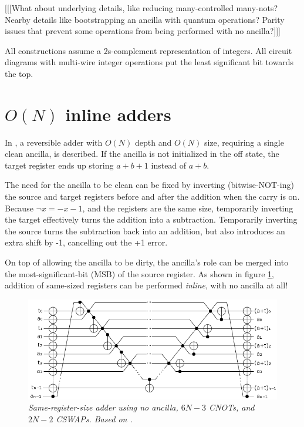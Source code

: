 \documentclass[twocolumn]{article}
\begin{document}
[[[What about underlying details, like reducing many-controlled many-nots? Nearby details like bootstrapping an ancilla with quantum operations? Parity issues that prevent some operations from being performed with no ancilla?]]]

All constructions assume a 2s-complement representation of integers.
All circuit diagrams with multi-wire integer operations put the least significant bit towards the top.

\section{$O(N)$ inline adders}

In \cite{van2004}, a reversible adder with $O(N)$ depth and $O(N)$ size, requiring a single clean ancilla, is described.
If the ancilla is not initialized in the off state, the target register ends up storing $a+b+1$ instead of $a+b$.

The need for the ancilla to be clean can be fixed by inverting (bitwise-NOT-ing) the source and target registers before and after the addition when the carry is on.
Because $\lnot x = -x-1$, and the registers are the same size, temporarily inverting the target effectively turns the addition into a subtraction.
Temporarily inverting the source turns the subtraction back into an addition, but also introduces an extra shift by -1, cancelling out the +1 error.

On top of allowing the ancilla to be dirty, the ancilla's role can be merged into the most-significant-bit (MSB) of the source register.
As shown in figure \ref{fig:inlineadder}, addition of same-sized registers can be performed {\em inline}, with no ancilla at all!

\begin{figure}
  \centering
  \includegraphics[totalheight=3cm]{inline-adder.png}
  \caption{\em Same-register-size adder using no ancilla, $6N-3$ CNOTs, and $2N-2$ CSWAPs. Based on \cite{van2004}.}
  \label{fig:inlineadder}
\end{figure}
\end{document}
